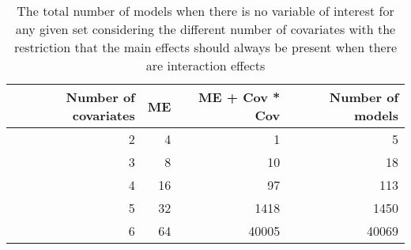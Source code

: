 \begin{table}[!h]
\centering
\caption{The total number of models when there is no variable of interest for any given set considering the different number of covariates with the restriction that the main effects should always be present when there are interaction effects} 
\begin{tabular}{rrrr}
  \hline
Number of covariates & ME & ME + Cov * Cov & Number of models \\ 
  \hline
2 & 4 & 1 & 5 \\ 
  3 & 8 & 10 & 18 \\ 
  4 & 16 & 97 & 113 \\ 
  5 & 32 & 1418 & 1450 \\ 
  6 & 64 & 40005 & 40069 \\ 
   \hline
\end{tabular}
\end{table}
